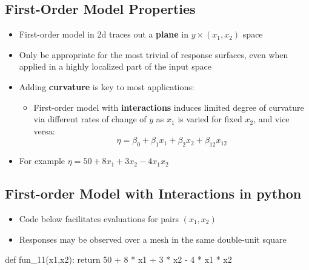 \documentclass[
  letterpaper,
  DIV=11,
  numbers=noendperiod]{scrreprt}
\newenvironment{Shaded}{\begin{snugshade}}{\end{snugshade}}
\newcommand{\ControlFlowTok}[1]{\textcolor[rgb]{0.00,0.23,0.31}{#1}}
\newcommand{\DecValTok}[1]{\textcolor[rgb]{0.68,0.00,0.00}{#1}}
\newcommand{\KeywordTok}[1]{\textcolor[rgb]{0.00,0.23,0.31}{#1}}
\newcommand{\NormalTok}[1]{\textcolor[rgb]{0.00,0.23,0.31}{#1}}
\newcommand{\OperatorTok}[1]{\textcolor[rgb]{0.37,0.37,0.37}{#1}}
\providecommand{\tightlist}{%
  \setlength{\itemsep}{0pt}\setlength{\parskip}{0pt}}\usepackage{longtable,booktabs,array}
\begin{document}
\hypertarget{first-order-model-properties}{%
\subsection{First-Order Model
Properties}\label{first-order-model-properties}}

\begin{itemize}
\tightlist
\item
  First-order model in 2d traces out a \textbf{plane} in
  \(y \times (x_1, x_2)\) space
\item
  Only be appropriate for the most trivial of response surfaces, even
  when applied in a highly localized part of the input space
\item
  Adding \textbf{curvature} is key to most applications:

  \begin{itemize}
  \tightlist
  \item
    First-order model with \textbf{interactions} induces limited degree
    of curvature via different rates of change of \(y\) as \(x_1\) is
    varied for fixed \(x_2\), and vice versa:
    \[\eta = \beta_0 + \beta_1 x_1 + \beta_2 x_2 + \beta_{12} x_{12} \]
  \end{itemize}
\item
  For example \(\eta = 50+8x_1+3x_2-4x_1x_2\)
\end{itemize}

\hypertarget{first-order-model-with-interactions-in-python}{%
\subsection{First-order Model with Interactions in
python}\label{first-order-model-with-interactions-in-python}}

\begin{itemize}
\tightlist
\item
  Code below facilitates evaluations for pairs \((x_1, x_2)\)
\item
  Responses may be observed over a mesh in the same double-unit square
\end{itemize}

\begin{Shaded}
\begin{Highlighting}[]
\KeywordTok{def}\NormalTok{ fun\_11(x1,x2):}
    \ControlFlowTok{return} \DecValTok{50} \OperatorTok{+} \DecValTok{8} \OperatorTok{*}\NormalTok{ x1 }\OperatorTok{+} \DecValTok{3} \OperatorTok{*}\NormalTok{ x2 }\OperatorTok{{-}} \DecValTok{4} \OperatorTok{*}\NormalTok{ x1 }\OperatorTok{*}\NormalTok{ x2}
\end{Highlighting}
\end{Shaded}
\end{document}
